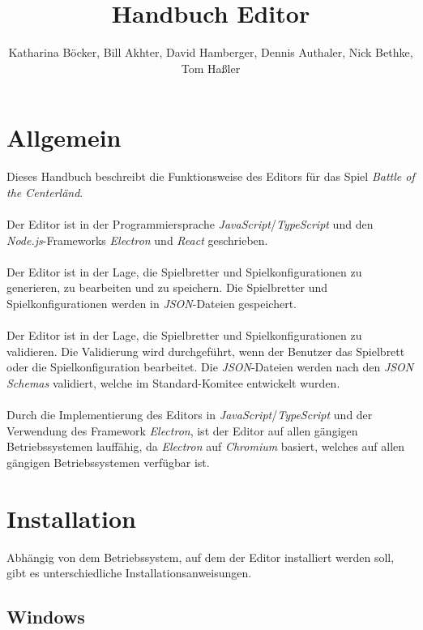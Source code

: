 \documentclass[12pt]{gruppe-11-article-a5}
\title{Handbuch Editor}
\author{Katharina Böcker, Bill Akhter, David Hamberger, Dennis Authaler, Nick Bethke, Tom Haßler}
\begin{document}
	\maketitle
	\tableofcontents
	\newpage
	\hypersetup{
		colorlinks=true,
		linkcolor=linkcolor,
		filecolor=magenta,
		urlcolor=urlcolor,
	}


	\section{Allgemein}\label{sec:allgemein2}

	Dieses Handbuch beschreibt die Funktionsweise des Editors für das Spiel \emph{Battle of the Centerländ}.
	\\\\
	Der Editor ist in der Programmiersprache \emph{JavaScript}/\emph{TypeScript} und den \emph{Node.js}-Frameworks \emph{Electron} und \emph{React} geschrieben.
	\\\\
	Der Editor ist in der Lage, die Spielbretter und Spielkonfigurationen zu generieren, zu bearbeiten und zu speichern.
	Die Spielbretter und Spielkonfigurationen werden in \emph{JSON}-Dateien gespeichert.
	\\\\
	Der Editor ist in der Lage, die Spielbretter und Spielkonfigurationen zu validieren.
	Die Validierung wird durchgeführt, wenn der Benutzer das Spielbrett oder die Spielkonfiguration bearbeitet.
	Die \emph{JSON}-Dateien werden nach den \emph{JSON Schemas} validiert, welche im Standard-Komitee entwickelt wurden.
	\\\\
	Durch die Implementierung des Editors in \emph{JavaScript}/\emph{TypeScript} und der Verwendung des Framework \emph{Electron}, ist der Editor auf allen gängigen Betriebssystemen lauffähig, da \emph{Electron} auf \emph{Chromium} basiert, welches auf allen gängigen Betriebssystemen verfügbar ist.


	\section{Installation}\label{sec:installation}

	Abhängig von dem Betriebssystem, auf dem der Editor installiert werden soll, gibt es unterschiedliche Installationsanweisungen.

	\subsection{Windows}\label{subsec:windows}
\end{document}
